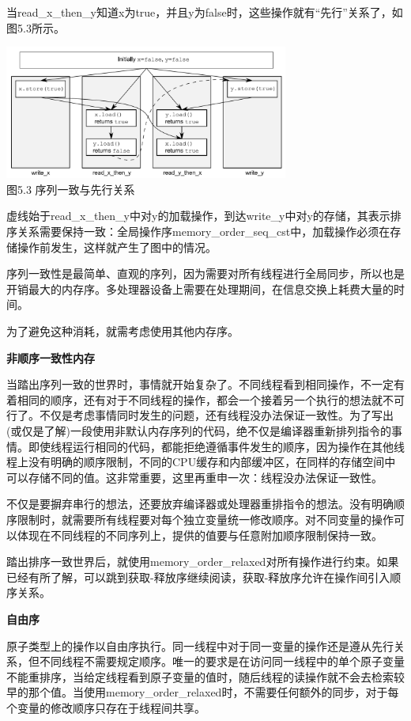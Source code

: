 当read\_x\_then\_y知道x为true，并且y为false时，这些操作就有“先行”关系了，如图5.3所示。

\begin{center}
    \includegraphics[width=0.7\textwidth]{content/chapter05/images/5-3.png}\\
    图5.3 序列一致与先行关系
\end{center}

虚线始于read\_x\_then\_y中对y的加载操作，到达write\_y中对y的存储，其表示排序关系需要保持一致：全局操作序memory\_order\_seq\_cst中，加载操作必须在存储操作前发生，这样就产生了图中的情况。

序列一致性是最简单、直观的序列，因为需要对所有线程进行全局同步，所以也是开销最大的内存序。多处理器设备上需要在处理期间，在信息交换上耗费大量的时间。

为了避免这种消耗，就需考虑使用其他内存序。

\textbf{非顺序一致性内存}

当踏出序列一致的世界时，事情就开始复杂了。不同线程看到相同操作，不一定有着相同的顺序，还有对于不同线程的操作，都会一个接着另一个执行的想法就不可行了。不仅是考虑事情同时发生的问题，还有线程没办法保证一致性。为了写出(或仅是了解)一段使用非默认内存序列的代码，绝不仅是编译器重新排列指令的事情。即使线程运行相同的代码，都能拒绝遵循事件发生的顺序，因为操作在其他线程上没有明确的顺序限制，不同的CPU缓存和内部缓冲区，在同样的存储空间中可以存储不同的值。这非常重要，这里再重申一次：线程没办法保证一致性。

不仅是要摒弃串行的想法，还要放弃编译器或处理器重排指令的想法。没有明确顺序限制时，就需要所有线程要对每个独立变量统一修改顺序。对不同变量的操作可以体现在不同线程的不同序列上，提供的值要与任意附加顺序限制保持一致。

踏出排序一致世界后，就使用memory\_order\_relaxed对所有操作进行约束。如果已经有所了解，可以跳到获取-释放序继续阅读，获取-释放序允许在操作间引入顺序关系。

\textbf{自由序}

原子类型上的操作以自由序执行。同一线程中对于同一变量的操作还是遵从先行关系，但不同线程不需要规定顺序。唯一的要求是在访问同一线程中的单个原子变量不能重排序，当给定线程看到原子变量的值时，随后线程的读操作就不会去检索较早的那个值。当使用memory\_order\_relaxed时，不需要任何额外的同步，对于每个变量的修改顺序只存在于线程间共享。


